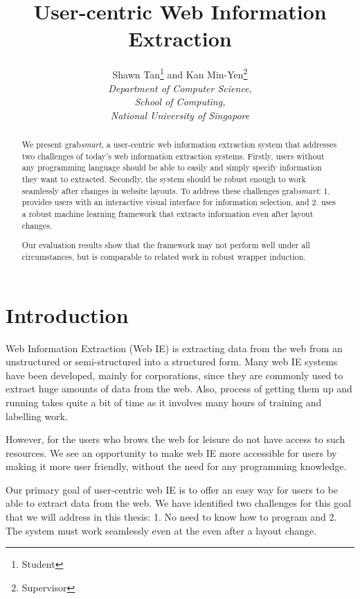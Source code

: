 \documentclass[a4paper,12pt]{nurop}
\begin{document}
\title{User-centric Web Information Extraction}

\author{\large{Shawn Tan}\footnote{Student} and \large{Kan Min-Yen}\footnote{Supervisor}\\
	\normalsize\textit{Department of Computer Science,\\
	School of Computing,\\
	National University of Singapore} 
}
\maketitle

\begin{abstract}
We present grab\textit{smart}, a user-centric web information extraction system that
addresses two challenges of today's web information extraction systems. Firstly, users
without any programming language should be able to easily and simply specify information
they want to extracted. Secondly, the system should be robust enough to work seamlessly
after changes in website layouts. To address these challenges grab\textit{smart}: 1.
provides users with an interactive visual interface for information selection, and 2.
uses a robust machine learning framework that extracts information even after layout changes.

Our evaluation results show that the framework may not perform well under all circumstances,
but is comparable to related work in robust wrapper induction.
\end{abstract}

\section{Introduction}
Web Information Extraction (Web IE) is extracting data from the web from an unstructured or
semi-structured into a structured form. Many web IE systems have been developed, mainly for
corporations, since they are commonly used to extract huge amounts of data from the web.
Also, process of getting them up and running takes quite a bit of time as it involves many
hours of training and labelling work.

However, for the users who brows the web for leisure do not have access to such resources.
We see an opportunity to make web IE more accessible for users by making it more user friendly,
without the need for any programming knowledge.

Our primary goal of user-centric web IE is to offer an easy way for users to be able to extract
data from the web. We have identified two challenges for this goal that we will address in this
thesis: 1. No need to know how to program and 2. The system must work seamlessly even at the 
even after a layout change.
\end{document}
